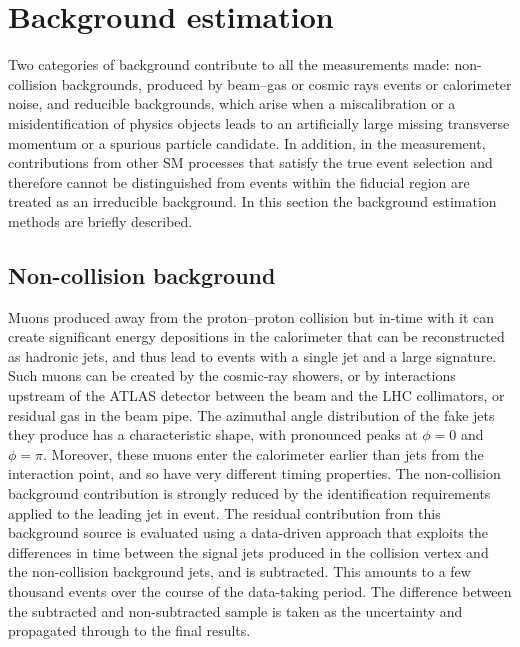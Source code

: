 \documentclass[atlasdraft=false, cernpreprint, UKenglish, texmf, orcidlogo]{atlasdoc}
\begin{document}

 

\section{Background estimation}
\label{sec:backgrounds}
 
Two categories of background contribute to all the measurements made: non-collision backgrounds, produced by beam--gas or cosmic rays events or calorimeter noise,
and reducible backgrounds, which arise when a miscalibration or a misidentification of physics objects leads to an artificially large missing transverse momentum or
a spurious particle candidate.
In addition, in the \Znunu measurement, contributions from other SM processes that satisfy the true event selection and therefore
cannot be distinguished from \Znunu events within the fiducial region are treated as an irreducible background.
In this section the background estimation methods are briefly described.
 
\subsection{Non-collision background\label{sec:noncol}}
 
Muons produced away from  the proton--proton collision but in-time with it can create significant energy depositions in the calorimeter that can be reconstructed
as hadronic jets, and thus lead to events with a single jet and a large \ptmiss signature.
Such muons can be created by the cosmic-ray showers, or by interactions upstream of the ATLAS detector between the beam and the LHC collimators, or residual gas in the beam pipe.
The azimuthal angle distribution of the fake jets they produce has a characteristic shape, with pronounced peaks at \(\phi=0\)  and \(\phi=\pi\).
Moreover, these muons enter the calorimeter earlier than jets from the interaction point, and so have very different timing properties.
The non-collision background contribution is strongly reduced by the identification requirements applied to the leading jet in event.
The residual contribution from this background source is evaluated using a data-driven approach that exploits the differences in time between the signal jets
produced in the collision vertex and the non-collision background jets, and is subtracted. This amounts to a few thousand events over the course of the data-taking period.
The difference between the
subtracted and non-subtracted sample is taken as the uncertainty and propagated through to the final results.
 
\end{document}

